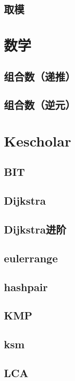 \documentclass[10pt,a4paper]{article}
\begin{document}
\subsection{取模}

\section{数学}
\subsection{组合数（递推）}

\subsection{组合数（逆元）}

\section{Kescholar}
\subsection{BIT}

\subsection{Dijkstra}

\subsection{Dijkstra进阶}

\subsection{eulerrange}

\subsection{hashpair}

\subsection{KMP}

\subsection{ksm}

\subsection{LCA}

\end{document}
